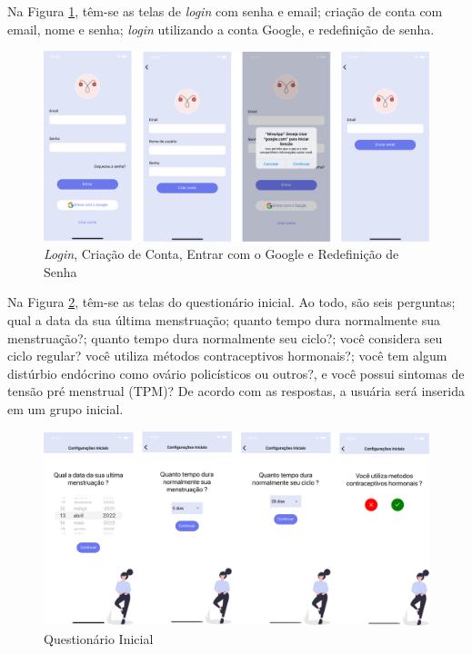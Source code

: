 Na Figura \ref{fig19}, têm-se as telas de \emph{login} com senha e email; criação de conta com email, nome e senha; 
\emph{login} utilizando a conta Google, e redefinição de senha.

\begin{figure}[ht]
	\caption{\emph{Login}, Criação de Conta, Entrar com o Google e Redefinição de Senha}
	\begin{center}
	\includegraphics[keepaspectratio=true,scale=0.08]{figuras/aplicativo1.png}
	\end{center}
    \label{fig19}
\end{figure}

Na Figura \ref{fig20}, têm-se as telas do questionário inicial. Ao todo, são seis perguntas; qual a data da sua 
última menstruação; quanto tempo dura normalmente sua menstruação?; quanto tempo dura normalmente seu ciclo?;
você considera seu ciclo regular? você utiliza métodos contraceptivos hormonais?; você tem algum distúrbio 
endócrino como ovário policísticos ou outros?, e você possui sintomas de tensão pré menstrual (TPM)? 
De acordo com as respostas, a usuária será inserida em um grupo inicial.

\begin{figure}[ht]
	\caption{Questionário Inicial}
	\begin{center}
	\includegraphics[keepaspectratio=true,scale=0.08]{figuras/aplicativo4.png}
	\end{center}
    \label{fig20}
\end{figure}

